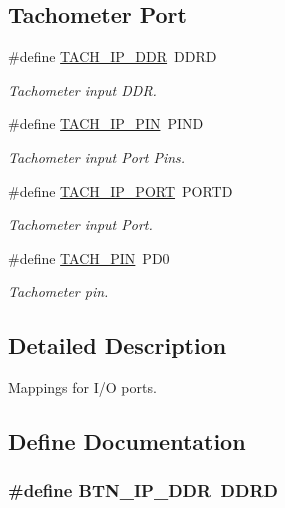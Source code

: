\subsection*{Tachometer Port}
\begin{DoxyCompactItemize}
\item 
\#define \hyperlink{group__port_defs_ga9eefb2c9faab81c342d44226ab78e512}{T\-A\-C\-H\-\_\-\-I\-P\-\_\-\-D\-D\-R}~D\-D\-R\-D
\begin{DoxyCompactList}\small\item\em Tachometer input D\-D\-R. \end{DoxyCompactList}\item 
\#define \hyperlink{group__port_defs_ga10298a14d4cfb65c0f404afcada4fa00}{T\-A\-C\-H\-\_\-\-I\-P\-\_\-\-P\-I\-N}~P\-I\-N\-D
\begin{DoxyCompactList}\small\item\em Tachometer input Port Pins. \end{DoxyCompactList}\item 
\#define \hyperlink{group__port_defs_ga9e9a01aac1a7ac7eab47b274ce737005}{T\-A\-C\-H\-\_\-\-I\-P\-\_\-\-P\-O\-R\-T}~P\-O\-R\-T\-D
\begin{DoxyCompactList}\small\item\em Tachometer input Port. \end{DoxyCompactList}\item 
\#define \hyperlink{group__port_defs_gaf84d0d7a25d38271813b650eeb6a4228}{T\-A\-C\-H\-\_\-\-P\-I\-N}~P\-D0
\begin{DoxyCompactList}\small\item\em Tachometer pin. \end{DoxyCompactList}\end{DoxyCompactItemize}


\subsection{Detailed Description}
Mappings for I/\-O ports. 

\subsection{Define Documentation}
\hypertarget{group__port_defs_ga0f1aed08f5269f1bddc80c20ecaec0be}{
\subsubsection[{B\-T\-N\-\_\-\-I\-P\-\_\-\-D\-D\-R}]{\setlength{\rightskip}{0pt plus 5cm}\#define {\bf B\-T\-N\-\_\-\-I\-P\-\_\-\-D\-D\-R}~D\-D\-R\-D}}\label{group__port_defs_ga0f1aed08f5269f1bddc80c20ecaec0be}


